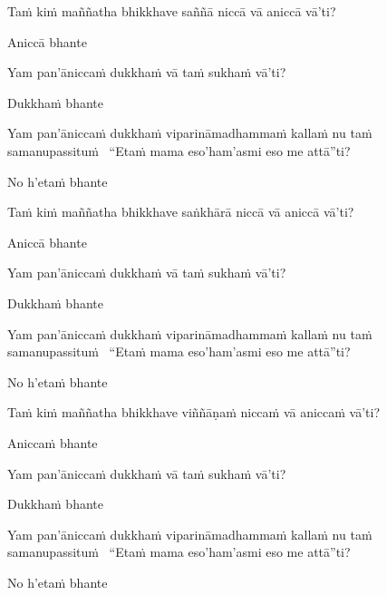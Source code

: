 \begin{pali-hang}
  Taṁ kiṁ maññatha bhikkhave saññā niccā vā aniccā vā'ti?
\end{pali-hang}
\begin{pali-hangtogether}
  Aniccā bhante
\end{pali-hangtogether}
\begin{pali-hangtogether}
  Yam pan'āniccaṁ dukkhaṁ vā taṁ sukhaṁ vā'ti?
\end{pali-hangtogether}
\begin{pali-hangtogether}
  Dukkhaṁ bhante
\end{pali-hangtogether}
\begin{pali-hangtogether}
  Yam pan'āniccaṁ dukkhaṁ viparināmadhammaṁ kallaṁ nu taṁ samanupassituṁ \breathmark\ ``Etaṁ mama eso'ham'asmi eso me attā''ti?
\end{pali-hangtogether}
\begin{pali-hangtogether}
  No h'etaṁ bhante
\end{pali-hangtogether}

\begin{pali-hang}
  Taṁ kiṁ maññatha bhikkhave saṅkhārā niccā vā aniccā vā'ti?
\end{pali-hang}
\begin{pali-hangtogether}
  Aniccā bhante
\end{pali-hangtogether}
\begin{pali-hangtogether}
  Yam pan'āniccaṁ dukkhaṁ vā taṁ sukhaṁ vā'ti?
\end{pali-hangtogether}
\begin{pali-hangtogether}
  Dukkhaṁ bhante
\end{pali-hangtogether}
\begin{pali-hangtogether}
  Yam pan'āniccaṁ dukkhaṁ viparināmadhammaṁ kallaṁ nu taṁ samanupassituṁ \breathmark\ ``Etaṁ mama eso'ham'asmi eso me attā''ti?
\end{pali-hangtogether}
\begin{pali-hangtogether}
  No h'etaṁ bhante
\end{pali-hangtogether}

\begin{pali-hang}
  Taṁ kiṁ maññatha bhikkhave viññāṇaṁ niccaṁ vā aniccaṁ vā'ti?
\end{pali-hang}
\begin{pali-hangtogether}
  Aniccaṁ bhante
\end{pali-hangtogether}
\begin{pali-hangtogether}
  Yam pan'āniccaṁ dukkhaṁ vā taṁ sukhaṁ vā'ti?
\end{pali-hangtogether}
\begin{pali-hangtogether}
  Dukkhaṁ bhante
\end{pali-hangtogether}
\begin{pali-hangtogether}
  Yam pan'āniccaṁ dukkhaṁ viparināmadhammaṁ kallaṁ nu taṁ samanupassituṁ \breathmark\ ``Etaṁ mama eso'ham'asmi eso me attā''ti?
\end{pali-hangtogether}
\begin{pali-hangtogether}
  No h'etaṁ bhante
\end{pali-hangtogether}

